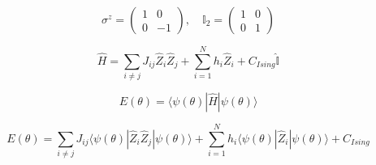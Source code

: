 \begin{equation}
    \sigma^z = \begin{pmatrix} 1 & 0 \\ 0 & -1 \end{pmatrix}, \quad \mathbb{I}_2 = \begin{pmatrix} 1 & 0 \\ 0 & 1 \end{pmatrix}
\end{equation}

\begin{equation}
    \hat{H} = \sum_{i \ne j} J_{ij} \hat{Z}_i \hat{Z}_j + \sum_{i=1}^N h_i \hat{Z}_i + C_{Ising} \hat{\mathbb{I}}
\end{equation}

\begin{equation}
    E(\theta) = \langle \psi(\theta) | \hat{H} | \psi(\theta) \rangle
\end{equation}

\begin{equation}
    E(\theta) = \sum_{i \ne j} J_{ij} \langle \psi(\theta) | \hat{Z}_i \hat{Z}_j | \psi(\theta) \rangle + \sum_{i=1}^N h_i \langle \psi(\theta) | \hat{Z}_i | \psi(\theta) \rangle + C_{Ising}
\end{equation}

